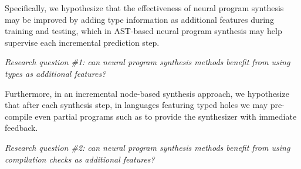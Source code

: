 \documentclass{article}
\begin{document}
Specifically, we hypothesize that the effectiveness of neural program synthesis may be improved by
adding type information as additional features during training and testing,
which in AST-based neural program synthesis may help supervise each incremental prediction step.

\begin{displayquote}
    \emph{Research question \#1: can neural program synthesis methods benefit from using types as additional features?}
\end{displayquote}

Furthermore, in an incremental node-based synthesis approach, we hypothesize that after each synthesis step,
in languages featuring typed holes we may pre-compile even partial programs such as to provide the synthesizer with immediate feedback.

\begin{displayquote}
    \emph{Research question \#2: can neural program synthesis methods benefit from using compilation checks as additional features?}
\end{displayquote}





\end{document}
